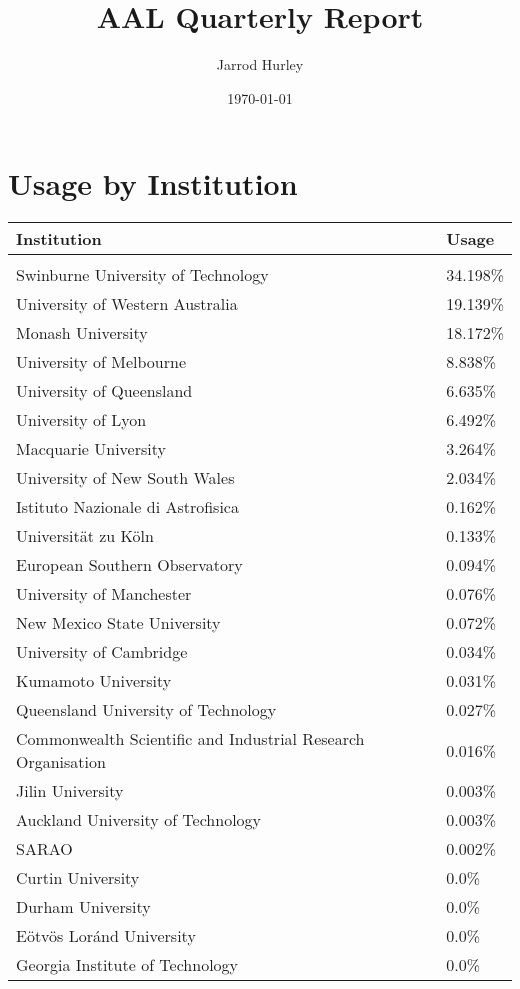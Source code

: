 \documentclass{article}%
\title{AAL Quarterly Report}%
\author{Jarrod Hurley}%
\date{\today}%
\begin{document}
%
\normalsize%
\maketitle%
\newpage%
\section{Usage by Institution }%

%
\begin{longtabu}{X[l] X[r]}%
\textbf{Institution}&\textbf{Usage}\\%
\hline%
&\\%
Swinburne University of Technology&34.198\%\\%
\hline%
University of Western Australia&19.139\%\\%
\hline%
Monash University&18.172\%\\%
\hline%
University of Melbourne&8.838\%\\%
\hline%
University of Queensland&6.635\%\\%
\hline%
University of Lyon&6.492\%\\%
\hline%
Macquarie University&3.264\%\\%
\hline%
University of New South Wales&2.034\%\\%
\hline%
Istituto Nazionale di Astrofisica&0.162\%\\%
\hline%
Universität zu Köln&0.133\%\\%
\hline%
European Southern Observatory&0.094\%\\%
\hline%
University of Manchester&0.076\%\\%
\hline%
New Mexico State University&0.072\%\\%
\hline%
University of Cambridge&0.034\%\\%
\hline%
Kumamoto University&0.031\%\\%
\hline%
Queensland University of Technology&0.027\%\\%
\hline%
Commonwealth Scientific and Industrial Research Organisation&0.016\%\\%
\hline%
Jilin University&0.003\%\\%
\hline%
Auckland University of Technology&0.003\%\\%
\hline%
SARAO&0.002\%\\%
\hline%
Curtin University&0.0\%\\%
\hline%
Durham University&0.0\%\\%
\hline%
Eötvös Loránd University&0.0\%\\%
\hline%
Georgia Institute of Technology&0.0\%\\%

\end{longtabu}
\end{document}
